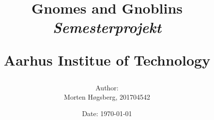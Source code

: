 \newcommand{\authorName}{Morten Høgsberg}
\newcommand{\titleName}{Gnomes and Gnoblins}
\newcommand{\subject}{Semesterprojekt}
\newcommand{\institute}{Aarhus Institue of Technology}
\begin{titlepage}
  \centering
    \title
    {
      \Huge \textbf{\titleName}\\
      \scale{\numberSQRTTWO}{\vspace{\sol pt}}
      \LARGE \textit{\subject}
      \scale{\numberSQRTTWO}{\rule{\linewidth}{\sol pt}}

      \textbf{\institute}
      \author
    {
      \LARGE Author: \\
      Morten Høgsberg, 201704542 \\ 
    }
      \date{\LARGE Date: \today}
    }
\end{titlepage}
